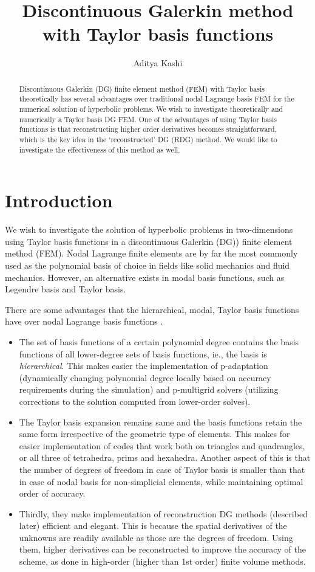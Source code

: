 \documentclass[11pt]{article}
\title{Discontinuous Galerkin method with Taylor basis functions}
\author{Aditya Kashi}
\begin{document}
\maketitle
\begin{abstract}
Discontinuous Galerkin (DG) finite element method (FEM) with Taylor basis theoretically has several advantages over traditional nodal Lagrange basis FEM for the numerical solution of hyperbolic problems. We wish to investigate theoretically and numerically a Taylor basis DG FEM. One of the advantages of using Taylor basis functions is that reconstructing higher order derivatives becomes straightforward, which is the key idea in the `reconstructed' DG (RDG) method. We would like to investigate the effectiveness of this method as well.
\end{abstract}

\section{Introduction}
We wish to investigate the solution of hyperbolic problems in two-dimensions using Taylor basis functions in a discontinuous Galerkin (DG)) finite element method (FEM). Nodal Lagrange finite elements are by far the most commonly used as the polynomial basis of choice in fields like solid mechanics and fluid mechanics. However, an alternative exists in modal basis functions, such as Legendre basis and Taylor basis.

There are some advantages that the hierarchical, modal, Taylor basis functions have over nodal Lagrange basis functions \cite{luo_taylor, aizinger_scaleseparation}. 
\begin{itemize}
\item The set of basis functions of a certain polynomial degree contains the basis functions of all lower-degree sets of basis functions, ie., the basis is \emph{hierarchical}. This makes easier the implementation of p-adaptation (dynamically changing polynomial degree locally based on accuracy requirements during the simulation) and p-multigrid solvers (utilizing corrections to the solution computed from lower-order solves).
\item The Taylor basis expansion remains same and the basis functions retain the same form irrespective of the geometric type of elements. This makes for easier implementation of codes that work both on triangles and quadrangles, or all three of tetrahedra, prims and hexahedra. Another aspect of this is that the number of degrees of freedom in case of Taylor basis is smaller than that in case of nodal basis for non-simplicial elements, while maintaining optimal order of accuracy.
\item Thirdly, they make implementation of reconstruction DG methods (described later) efficient and elegant. This is because the spatial derivatives of the unknowns are readily available as those are the degrees of freedom. Using them, higher derivatives can be reconstructed to improve the accuracy of the scheme, as done in high-order (higher than 1st order) finite volume methods.
\end{itemize}
\end{document}
